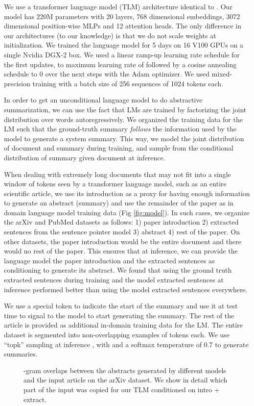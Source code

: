 \documentclass[letterpaper]{article} \usepackage{arXiv_V2_aaai_sty_mods}  \usepackage{times}  \usepackage{helvet} \usepackage{courier}  \usepackage[hyphens]{url}  \usepackage{graphicx} \usepackage[utf8]{inputenc} \usepackage[T1]{fontenc}    \usepackage{url}            \usepackage{booktabs}       \usepackage{amsfonts}       \usepackage{nicefrac}       \usepackage{multirow}
\begin{document}
We use a transformer \cite{DBLP:journals/corr/VaswaniSPUJGKP17} language model (TLM) architecture identical to \cite{radford2019language}. Our model has 220M parameters with 20 layers, 768 dimensional embeddings, 3072 dimensional position-wise MLPs and 12 attention heads. The only difference in our architectures (to our knowledge) is that we do not scale weights at initialization. We trained the language model for 5 days on 16 V100 GPUs on a single Nvidia DGX-2 box. We used a linear ramp-up learning rate schedule for the first  updates, to maximum learning rate of  followed by a cosine annealing schedule to 0 over the next  steps with the Adam optimizer. We used mixed-precision training \cite{micikevicius2017mixed} with a batch size of 256 sequences of 1024 tokens each.

In order to get an unconditional language model to do abstractive summarization, we can use the fact that LMs are trained by factorizing the joint distribution over words autoregressively. We organized the training data for the LM such that the ground-truth summary \textit{follows} the information used by the model to generate a system summary. This way, we model the joint distribution of document and summary during training, and sample from the conditional distribution of summary given document at inference. 

When dealing with extremely long documents that may not fit into a single window of tokens seen by a transformer language model, such as an entire scientific article, we use its introduction as a proxy for having enough information to generate an abstract (summary) and use the remainder of the paper as in domain language model training data (Fig \ref{fig:model}). In such cases, we organize the arXiv and PubMed datasets as follows: 1) paper introduction 2) extracted sentences from the sentence pointer model 3) abstract 4) rest of the paper. On other datasets, the paper introduction would be the entire document and there would no rest of the paper. This ensures that at inference, we can provide the language model the paper introduction and the extracted sentences as conditioning to generate its abstract. We found that using the ground truth extracted sentences during training and the model extracted sentences at inference performed better than using the model extracted sentences everywhere.

We use a special token to indicate the start of the summary and use it at test time to signal to the model to start generating the summary. The rest of the article is provided as additional in-domain training data for the LM.
The entire dataset is segmented into non-overlapping examples of  tokens each. We use ``topk'' sampling at inference \cite{fan2018hierarchical,radford2019language}, with  and a softmax temperature of 0.7 to generate summaries.
\begin{figure}[htb]
    \caption{\label{fig:abstractiveness} -gram overlaps between the abstracts generated by different models and the input article on the arXiv dataset. We show in detail which part of the input was copied for our TLM conditioned on intro + extract.}
\end{figure}
\end{document}
